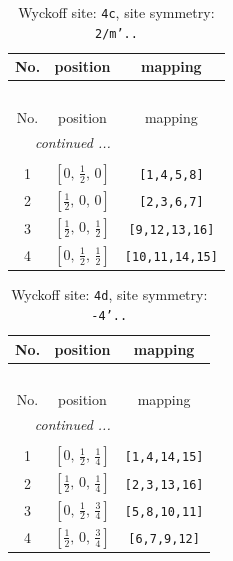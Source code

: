 \documentclass[fleqn,8pt]{jsarticle}
\begin{document}
\renewcommand{\arraystretch}{1.2}
\begin{longtable}{ccc}
\caption{Wyckoff site: {\tt 4c}, site symmetry: {\tt 2/m'..}}
 \\
 \hline \hline
No. & position & mapping \\ \hline \endfirsthead

\multicolumn{2}{l}{\tablename\ \thetable{}} \\
 \hline \hline
No. & position & mapping \\ \hline \endhead

 \hline \hline
\multicolumn{2}{r}{\footnotesize\it continued ...} \\ \endfoot

 \hline \hline
\multicolumn{2}{r}{} \\ \endlastfoot

1 & $\left[ 0,\, \frac{1}{2},\, 0 \right]$ & {\tt [1,4,5,8]} \\ \hline
2 & $\left[ \frac{1}{2},\, 0,\, 0 \right]$ & {\tt [2,3,6,7]} \\ \hline
3 & $\left[ \frac{1}{2},\, 0,\, \frac{1}{2} \right]$ & {\tt [9,12,13,16]} \\ \hline
4 & $\left[ 0,\, \frac{1}{2},\, \frac{1}{2} \right]$ & {\tt [10,11,14,15]} \\
\end{longtable}
\renewcommand{\arraystretch}{1.2}
\begin{longtable}{ccc}
\caption{Wyckoff site: {\tt 4d}, site symmetry: {\tt -4'..}}
 \\
 \hline \hline
No. & position & mapping \\ \hline \endfirsthead

\multicolumn{2}{l}{\tablename\ \thetable{}} \\
 \hline \hline
No. & position & mapping \\ \hline \endhead

 \hline \hline
\multicolumn{2}{r}{\footnotesize\it continued ...} \\ \endfoot

 \hline \hline
\multicolumn{2}{r}{} \\ \endlastfoot

1 & $\left[ 0,\, \frac{1}{2},\, \frac{1}{4} \right]$ & {\tt [1,4,14,15]} \\ \hline
2 & $\left[ \frac{1}{2},\, 0,\, \frac{1}{4} \right]$ & {\tt [2,3,13,16]} \\ \hline
3 & $\left[ 0,\, \frac{1}{2},\, \frac{3}{4} \right]$ & {\tt [5,8,10,11]} \\ \hline
4 & $\left[ \frac{1}{2},\, 0,\, \frac{3}{4} \right]$ & {\tt [6,7,9,12]} \\
\end{longtable}
\end{document}
